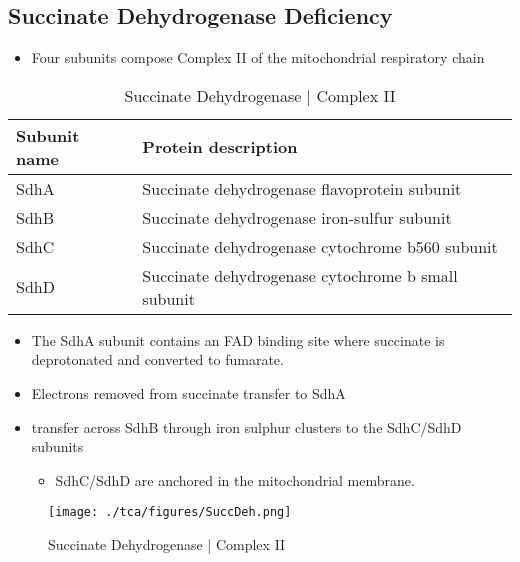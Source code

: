 \documentclass{scrartcl}
\begin{document}
\subsection{Succinate Dehydrogenase Deficiency}
\label{sec:org9c19105}
\begin{itemize}
\item Four subunits compose Complex II of the mitochondrial respiratory chain
\end{itemize}

\begin{table}[htbp]
\caption{\label{tab:org694c16f}
Succinate Dehydrogenase | Complex II}
\centering
\begin{tabular}{ll}
Subunit name & Protein description\\
\hline
SdhA & Succinate dehydrogenase flavoprotein subunit\\
SdhB & Succinate dehydrogenase iron-sulfur subunit\\
SdhC & Succinate dehydrogenase cytochrome b560 subunit\\
SdhD & Succinate dehydrogenase cytochrome b small subunit\\
\end{tabular}
\end{table}

\begin{itemize}
\item The SdhA subunit contains an FAD binding site where succinate
is deprotonated and converted to fumarate.
\end{itemize}


\begin{itemize}
\item Electrons removed from succinate transfer to SdhA
\item transfer across SdhB through iron sulphur clusters to the SdhC/SdhD subunits
\begin{itemize}
\item SdhC/SdhD are anchored in the mitochondrial membrane.
\end{itemize}
\end{itemize}

\begin{figure}[htbp]
\centering
\texttt{[image: ./tca/figures/SuccDeh.png]}
\caption{\label{fig:org3bac45d}
Succinate Dehydrogenase | Complex II}
\end{figure}
\end{document}
